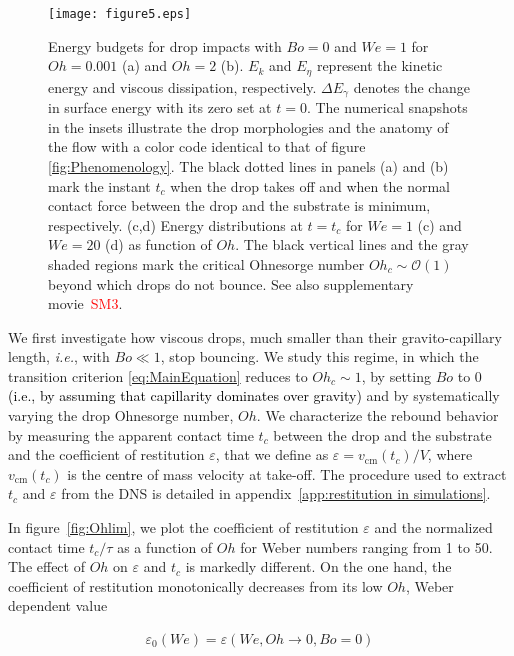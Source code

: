 \documentclass{jfm}
\newcommand*\red{\textcolor{red}}
\newcommand{\Ohn}{\mathit{Oh}}
\newcommand{\Ohc}{\mathit{Oh}_\mathit{c}}
\newcommand{\Wen}{\mathit{We}}
\newcommand{\Bon}{\mathit{Bo}}
\newcommand{\revRev}[1]{\textcolor{black}{#1}}
\begin{document}
\begin{figure}
	\centering
	\texttt{[image: figure5.eps]}
	\caption{Energy budgets for drop impacts with $\Bon = 0$ and $\Wen = 1$ for $\Ohn = 0.001$ (a) and  $\Ohn = 2$ (b). $E_k$ and $E_\eta$ represent the kinetic energy and viscous dissipation, respectively. $\Delta E_\gamma$ denotes the change in surface energy with its zero set at $t = 0$. 
	The numerical snapshots in the insets illustrate the drop morphologies and the anatomy of the flow with a color code identical to that of figure \ref{fig:Phenomenology}.
	The black dotted lines in panels (a) and (b) mark the instant $t_c$ when the drop takes off and when the normal contact force between the drop and the substrate is minimum, respectively. 
	(c,d) Energy distributions at $t = t_c$ for $\Wen = 1$ (c) and $\Wen = 20$ (d) as function of $\Ohn$. The black vertical lines and the gray shaded regions mark the critical Ohnesorge number $\Ohc \sim \mathcal{O}\left(1\right)$ beyond which drops do not bounce. See also supplementary movie~\red{SM3}.}
	\label{fig:OhlimDescription}
\end{figure}

We first investigate how viscous drops, much smaller than their gravito-capillary length, {\it i.e.}, with $\Bon \ll 1$, stop bouncing.
We study this regime, in which the transition criterion \eqref{eq:MainEquation} reduces to $\Ohc \sim 1$, by setting $\Bon$ to $0$ \revRev{(i.e., by assuming that capillarity dominates over gravity)} and by systematically varying the drop Ohnesorge number, $\Ohn$.
We characterize the rebound behavior by measuring the apparent contact time $t_c$ between the drop and the substrate and the coefficient of restitution $\varepsilon$, that we define as $\varepsilon = v_\text{cm}(t_c)/V$, where $v_\text{cm}(t_c)$ is the \revRev{centre} of mass velocity at take-off.
The procedure used to extract $t_c$ and $\varepsilon$ from the DNS is detailed in appendix~\ref{app:restitution in simulations}.

In figure~\ref{fig:Ohlim}, we plot the coefficient of restitution $\varepsilon$ and the normalized contact time $t_c/\tau$ as a function of $\Ohn$ for Weber numbers ranging from 1 to 50.
The effect of $\Ohn$ on $\varepsilon$ and $t_c$ is markedly different.
On the one hand, the coefficient of restitution monotonically decreases from its low $\Ohn$, Weber dependent value

\begin{align}
	\varepsilon_0\left(\Wen\right) = \varepsilon\left(\Wen, \Ohn \to 0, \Bon = 0\right)
	\label{Eqn:Epsilon0Def}
\end{align}
\end{document}
